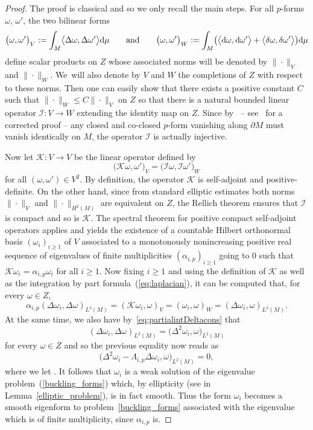 \documentclass[10pt,a4paper]{amsart}
\numberwithin{equation}{section}
\theoremstyle{definition}
\begin{document}
\begin{proof}
The proof is classical and so we only recall the main steps. For all $p$-forms $\omega$, $\omega'$, the two bilinear forms
\[
\bigl(\omega,\omega'\bigr)_V:=\int_M\bigl\langle\Delta\omega,\Delta\omega'\bigr\rangle
{\rm d}\mu \qquad \textrm{and}\qquad \bigl(\omega,\omega'\bigr)_W:=\int_{M}\bigl(
\bigl\langle {\rm d}\omega,{\rm d}\omega'\bigr\rangle+\bigl\langle \delta\omega,\delta\omega'\bigr\rangle\bigr) {\rm d}\mu
\]
define scalar products on $Z$ whose associated norms will be denoted by $\|\cdot\|_V$ and $\|\cdot\|_W$.
We~will also denote by $V$ and $W$ the completions of $Z$ with respect to these norms.
Then one can easily show that there exists a positive constant $C$ such that $\|\cdot\|_W\leq C\|\cdot\|_V$ on $Z$ so that there is a natural bounded linear operator $\mathcal{I}\colon V\rightarrow W$ extending the identity map on $Z$.
Since by~\cite{Anne89} -- see~\cite{ChadrakarGittinsHabibPeyerimhoff2025} for a corrected proof -- any closed and co-closed $p$-form vanishing along $\partial M$ must vanish identically on $M$, the operator $\mathcal{I}$ is actually injective.

Now let $\mathcal{K}\colon V\to V$ be the linear operator defined by
\[
\bigl(\mathcal{K}\omega,\omega'\bigr)_V=\bigl(\mathcal{I}\omega,
\mathcal{I}\omega'\bigr)_W
\]
for all $(\omega,\omega')\in V^2$.
By definition, the operator $\mathcal{K}$ is self-adjoint and positive-definite.
On the other hand, since from standard elliptic estimates both norms $\|\cdot\|_V$ and $\|\cdot\|_{H^2(M)}$ are equivalent on $Z$, the Rellich theorem ensures that $\mathcal{I}$ is compact and so is $\mathcal{K}$.
The spectral theorem for positive compact self-adjoint operators applies and yields the existence of a countable Hilbert or\-tho\-nor\-mal basis $(\omega_i)_{i\geq 1}$ of $V$ associated to a mo\-no\-to\-nous\-ly nonincreasing positive real sequence of eigenvalues of finite multiplicities $(\alpha_{i,p})_{i\geq1}$ going to $0$ such that $\mathcal{K}\omega_i=\alpha_{i,p}\omega_i$ for all $i\geq1$. Now fixing $i\geq 1$ and using the definition of $\mathcal{K}$ as well as the integration by part formula~(\ref{eq:laplacian}), it can be computed that, for every $\omega\in Z$,
\[%
\alpha_{i,p}(\Delta\omega_i,\Delta\omega)_{L^2(M)} =(\mathcal{K}\omega_i,\omega)_V
=(\omega_i,\omega)_W=(\Delta\omega_i,\omega)_{L^2(M)}.
\]
At the same time, we also have by~\eqref{eq:partialintDeltacons} that
\[%
(\Delta\omega_i,\Delta\omega)_{L^2(M)}= \bigl(\Delta^2\omega_i,\omega\bigr)_{L^2(M)}
\]
for every $\omega\in Z$ and so the previous equality now reads as
\[
\bigl(\Delta^2\omega_i-\Lambda_{i,p}\Delta \omega_i,
\omega\bigr)_{L^2(M)}=0,
\]
where we let .
It follows that $\omega_i$ is a weak solution of the eigenvalue problem~(\ref{buckling_forms}) which, by ellipticity (see in Lemma~\ref{elliptic_problem}), is in fact smooth.
Thus the form $\omega_i$ becomes a smooth eigenform to problem~\eqref{buckling_forms} associated with the eigenvalue  which is of finite multiplicity, since $\alpha_{i,p}$ is.


\end{proof}
\end{document}
